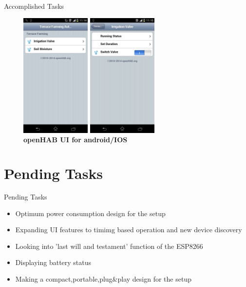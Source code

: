\documentclass[10pt, a4paper]{beamer}
\begin{document}
\begin{frame}{Accomplished Tasks}
\begin{itemize}
\begin{figure}
		  \includegraphics[width=3.5cm]{app1.jpg} \hspace{1cm}
		 \includegraphics[width=3.5cm]{app2.jpg}\\
		 {\bf openHAB UI for android/IOS}
		\end{figure}
	\end{itemize}	
 
\end{frame}

\section{Pending Tasks}
\begin{frame}{Pending Tasks}
        \begin{itemize}
		\item Optimum power consumption design for the setup   
		\item Expanding UI features to timimg based operation and new device discovery
		\item Looking into 'last will and testament' function of the ESP8266
		\item Displaying battery status
		\item Making a compact,portable,plug\&play design for the setup 		
	\end{itemize}	
\end{frame}
\end{document}
